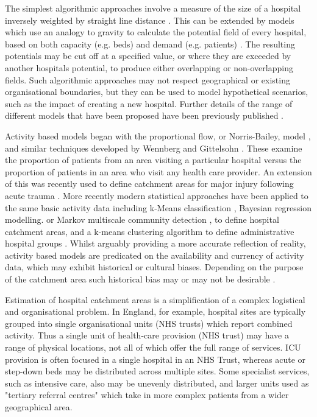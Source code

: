 \documentclass[twocolumn]{bmcart}%
\begin{document}
The simplest algorithmic approaches involve a measure of the size of a hospital inversely weighted by straight line 
distance \cite{reillyLawRetailGravitation1931}. This can be extended by models which use an analogy to gravity to 
calculate the potential field of every hospital, based on both capacity (e.g. beds) and demand (e.g. patients) 
\cite{huffDefiningEstimatingTrading1964,reillyLawRetailGravitation1931,stewartInverseDistanceVariation1941}. The 
resulting potentials may be cut off at a specified value, or where they are exceeded by another hospitals potential, to 
produce either overlapping or non-overlapping fields. Such algorithmic approaches may not respect geographical or 
existing organisational boundaries, but they can be used to model hypothetical scenarios, such as the impact of 
creating a new hospital. Further details of the range of different models that have been proposed have been previously 
published \cite{jonesModellingCatchmentAreas2011,gilmourIdentificationHospitalCatchment2010}. 

Activity based models began with the proportional flow, or Norris-Bailey, model 
\cite{baileyStatisticsHospitalPlanning1956,norrisRoleStatisticsRegional1952}, and similar techniques developed by 
Wennberg and Gittelsohn \cite{wennbergSmallAreaVariations1973a}. These examine the proportion of patients from an area 
visiting a particular hospital versus the proportion of patients in an area who visit any health care provider. An 
extension of this was recently used to define catchment areas for major injury following acute trauma 
\cite{alexandrescuProposedApproachDefining2008}. More recently modern statistical approaches have been applied to the 
same basic activity data including k-Means classification \cite{gilmourIdentificationHospitalCatchment2010}, Bayesian 
regression modelling. \cite{wangCatchmentAreaAnalysis2015} or Markov multiscale community detection 
\cite{clarkeDefiningHospitalCatchment2019,clarkeIdentifyingNaturallyOccurring2020}, to define hospital catchment areas, 
and a k-means clustering algorithm to define administrative hospital groups \cite{delamaterRegionalHealthCare2013}. 
Whilst arguably providing a more accurate reflection of reality, activity based models are predicated on the 
availability and currency of activity data, which may exhibit historical or cultural biases. Depending on the purpose of 
the catchment area such historical bias may or may not be desirable \cite{gilmourIdentificationHospitalCatchment2010}.

Estimation of hospital catchment areas is a simplification of a complex logistical and organisational problem. In 
England, for example, hospital sites are typically grouped into single organisational units (NHS trusts) which report 
combined activity. Thus a single unit of health-care provision (NHS trust) may have a range of physical locations, not 
all of which offer the full range of services. ICU provision is often focused in a single hospital in an NHS Trust, 
whereas acute or step-down beds may be distributed across multiple sites. Some specialist services, such as intensive 
care, also may be unevenly distributed, and larger units used as "tertiary referral centres" which take in more complex 
patients from a wider geographical area.
\end{document}
